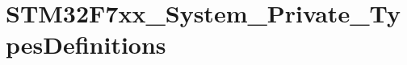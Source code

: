 \hypertarget{group__STM32F7xx__System__Private__TypesDefinitions}{}\section{S\+T\+M32\+F7xx\+\_\+\+System\+\_\+\+Private\+\_\+\+Types\+Definitions}
\label{group__STM32F7xx__System__Private__TypesDefinitions}
